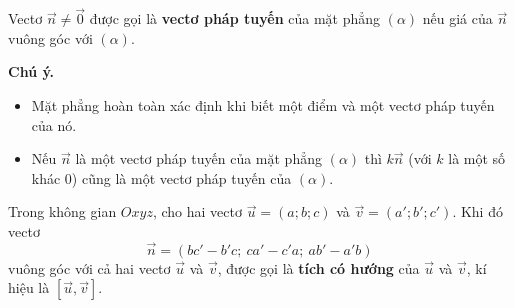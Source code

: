 
\lithuyet

\begin{dinhnghia}
\begin{minipage}[c]{.62\linewidth}
Vectơ $\vec n\ne\vec0$ được gọi là \textbf{vectơ pháp tuyến} của mặt phẳng $(\alpha)$ nếu giá của $\vec n$ vuông góc với $(\alpha)$.

\smallskip\textbf{\color{dcnhan}Chú ý.}
\begin{itemize}
  \item Mặt phẳng hoàn toàn xác định khi biết một điểm và một vectơ pháp tuyến của nó.
  \item Nếu $\vec n$ là một vectơ pháp tuyến của mặt phẳng $(\alpha)$ thì $k\vec n$ (với $k$ là một số khác $0$) cũng là một vectơ pháp tuyến của $(\alpha)$.
\end{itemize}
\end{minipage}\hfill
\begin{minipage}[c]{.35\linewidth}\centering
{}
\end{minipage}
\end{dinhnghia}

\begin{dinhnghia}
\begin{minipage}[c]{.62\linewidth}
Trong không gian $Oxyz$, cho hai vectơ $\vec u=(a;b;c)$ và $\vec v=(a';b';c')$. Khi đó vectơ
\[\vec n=(bc'-b'c;\ ca'-c'a;\ ab'-a'b)\]
vuông góc với cả hai vectơ $\vec u$ và $\vec v$, được gọi là \textbf{tích có hướng} của $\vec u$ và $\vec v$, kí hiệu là $[\vec u,\vec v]$.
\end{minipage}\hfill
\begin{minipage}[c]{.35\linewidth}\centering
{}
\end{minipage}
\end{dinhnghia}

